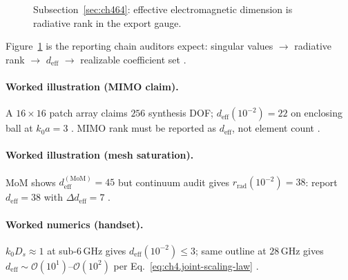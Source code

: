 \begin{figure}[t]
\centering
{}
\caption{Subsection~\ref{sec:ch464}: effective electromagnetic dimension is radiative rank in the export gauge.}
\label{fig:ch4.effective-em-dimension}
\end{figure}

Figure~\ref{fig:ch4.effective-em-dimension} is the reporting chain auditors expect: singular values \(\to\) radiative rank \(\to\)
\(d_{\mathrm{eff}}\) \(\to\) realizable coefficient set \cite{hansen1988,stratton1941}.

\paragraph{Worked illustration (MIMO claim).}
A \(16\times16\) patch array claims \(256\) synthesis DOF; \(d_{\mathrm{eff}}(10^{-2})=22\) on enclosing ball at \(k_{0}a=3\)
\cite{harrington2001,collin2001,hansen1988}. MIMO rank must be reported as \(d_{\mathrm{eff}}\), not element count \cite{devaney2004}.

\paragraph{Worked illustration (mesh saturation).}
MoM shows \(d_{\mathrm{eff}}^{\mathrm{(MoM)}}=45\) but continuum audit gives \(r_{\mathrm{rad}}(10^{-2})=38\): report \(d_{\mathrm{eff}}=38\)
with \(\Delta d_{\mathrm{eff}}=7\) \cite{harrington2001,hansen1988}.

\paragraph{Worked numerics (handset).}
\(k_{0}D_{s}\approx1\) at sub-6\,GHz gives \(d_{\mathrm{eff}}(10^{-2})\le3\); same outline at \(28\,\mathrm{GHz}\) gives
\(d_{\mathrm{eff}}\sim\mathcal{O}(10^{1})\)--\(\mathcal{O}(10^{2})\) per Eq.~\eqref{eq:ch4.joint-scaling-law} \cite{jackson1999,harrington2001,collin2001}.

